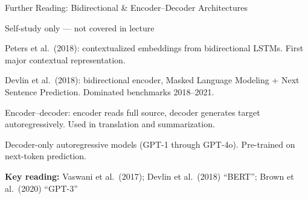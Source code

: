 \documentclass[aspectratio=169, 10pt]{beamer}
\begin{document}
\begin{frame}{Further Reading: Bidirectional \& Encoder--Decoder Architectures}

\begin{block}{Self-study only --- not covered in lecture}
\vspace{2pt}
\begin{description}[leftmargin=2.0cm]
  \item[ELMo] Peters et al.\ (2018): contextualized embeddings from bidirectional LSTMs. First major contextual representation.
  \item[BERT] Devlin et al.\ (2018): bidirectional encoder, Masked Language Modeling + Next Sentence Prediction. Dominated benchmarks 2018--2021.
  \item[T5 / BART] Encoder--decoder: encoder reads full source, decoder generates target autoregressively. Used in translation and summarization.
  \item[GPT lineage] Decoder-only autoregressive models (GPT-1 through GPT-4o). Pre-trained on next-token prediction.
\end{description}
\vspace{4pt}
\textbf{Key reading:} Vaswani et al.\ (2017); Devlin et al.\ (2018) ``BERT''; Brown et al.\ (2020) ``GPT-3''
\end{block}

\end{frame}
\end{document}
